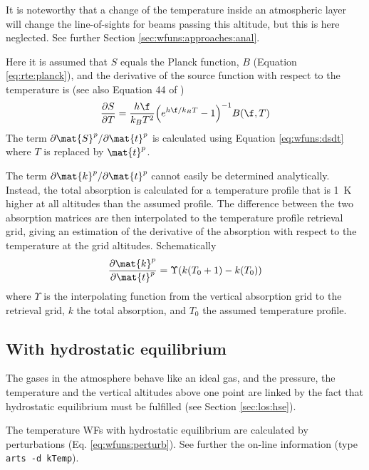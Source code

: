  It is noteworthy that a change of the temperature inside an
 atmospheric layer will change the line-of-sights for beams passing
 this altitude, but this is here neglected. See further Section
 \ref{sec:wfuns:approaches:anal}.

 Here it is assumed that $S$ equals the Planck function, $B$
 (Equation \ref{eq:rte:planck}), and the derivative of the source
 function with respect to the temperature is (see also Equation 44 of
 \citet{eriksson:00a})
 \begin{equation}
   \frac{\partial S}{\partial T} = \frac{h\f}{k_BT^2}
        \Big( e^{h\f/k_BT} - 1  \Big)^{-1}B(\f,T)
   \label{eq:wfuns:dsdt}
 \end{equation}
 The term $\partial \mat{S}^p / \partial \mat{t}^p$ is calculated
 using Equation \ref{eq:wfuns:dsdt} where $T$ is replaced by $\mat{t}^p$.

 The term $\partial \mat{k}^p/\partial \mat{t}^p$ cannot easily be
 determined analytically. Instead, the total absorption is calculated
 for a temperature profile that is 1~K higher at all altitudes than
 the assumed profile. The difference between the two absorption
 matrices are then interpolated to the temperature profile retrieval
 grid, giving an estimation of the derivative of the absorption
 with respect to the temperature at the grid altitudes. Schematically
 \begin{eqnarray}
   \frac{\partial \mat{k}^p}{\partial \mat{t}^p} = \Upsilon(k(T_0+1)-k(T_0))
     \nonumber
 \end{eqnarray}
 where $\Upsilon$ is the interpolating function from the vertical
 absorption grid to the retrieval grid, $k$ the total absorption, and
 $T_0$ the assumed temperature profile.
 

 \subsection{With hydrostatic equilibrium}
 
 The gases in the atmosphere behave like an ideal gas, and the pressure,
 the temperature and the vertical altitudes above one point are
 linked by the fact that hydrostatic equilibrium must be fulfilled
 (see Section \ref{sec:los:hse}). 

 The temperature WFs with hydrostatic equilibrium are calculated by
 perturbations (Eq. \ref{eq:wfuns:perturb}). See further the on-line
 information (type \verb|arts -d kTemp|).


% 


